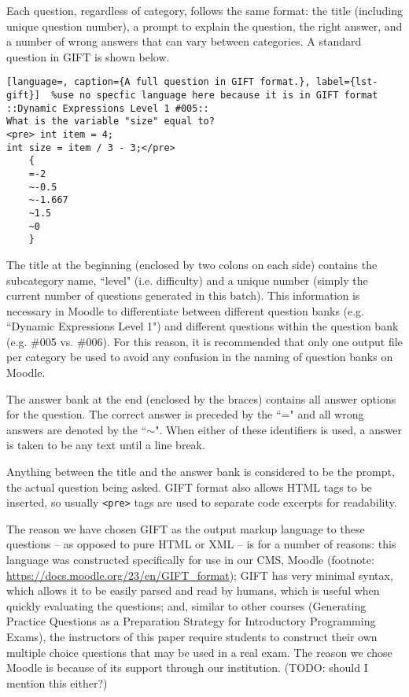 \documentclass{article}
\begin{document}
Each question, regardless of category, follows the same format: the title (including unique question number),
a prompt to explain the question, the right answer, and a number of wrong answers that can vary between categories.
A standard question in GIFT is shown below.

\begin{lstlisting}[language=, caption={A full question in GIFT format.}, label={lst-gift}]	%use no specfic language here because it is in GIFT format
::Dynamic Expressions Level 1 #005::
What is the variable "size" equal to?
<pre> int item = 4; 
int size = item / 3 - 3;</pre>
	{ 
	=-2 
	~-0.5 
	~-1.667 
	~1.5 
	~0 
	}
\end{lstlisting}


The title at the beginning (enclosed by two colons on each side) contains the subcategory name, ``level" (i.e. difficulty) and a unique number (simply the current number
of questions generated in this batch). This information is necessary in Moodle to differentiate between different question banks (e.g. ``Dynamic Expressions Level 1") and different questions within the question bank (e.g. \#005 vs. \#006). For this reason, it is recommended that only one output file per category be used to avoid any confusion
in the naming of question banks on Moodle.

The answer bank at the end (enclosed by the braces) contains all answer options for the question. The correct answer is preceded by the ``=" and all wrong answers are denoted by
the ``$\sim$". When either of these identifiers is used, a answer is taken to be any text until a line break.

Anything between the title and the answer bank is
considered to be the prompt, the actual question being asked. GIFT format also allows HTML tags to be inserted,
so usually \verb;<pre>; tags are used to separate code excerpts for readability.

The reason we have chosen GIFT as the output markup language to these questions -- as opposed to pure HTML or XML -- is for a number of reasons: this language was constructed specifically for use in our CMS, Moodle (footnote: \url{https://docs.moodle.org/23/en/GIFT_format}); GIFT has very minimal syntax, which allows it to be easily parsed and read by humans, which is useful when quickly evaluating the questions; and, similar to other courses (Generating Practice Questions as a Preparation Strategy
for Introductory Programming Exams), the instructors of this paper require students to construct their own multiple choice questions that may be used in a real exam. The reason we chose Moodle is because of its support through our institution. (TODO: should I mention this either?)
\end{document}

